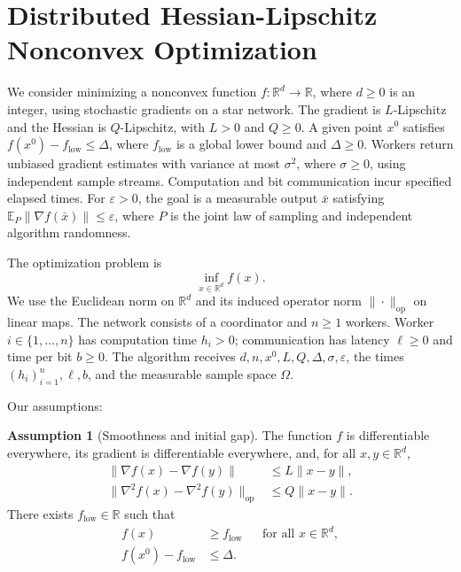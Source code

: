 \documentclass[10pt]{article}
\theoremstyle{definition}
\newtheorem{assumption}{Assumption}
\begin{document}
\section*{Distributed Hessian-Lipschitz Nonconvex Optimization}
We consider minimizing a nonconvex function $f:\mathbb{R}^d\to\mathbb{R}$, where $d\geq0$ is an integer, using stochastic gradients on a star network. The gradient is $L$-Lipschitz and the Hessian is $Q$-Lipschitz, with $L>0$ and $Q\geq0$. A given point $x^0$ satisfies $f(x^0)-f_{\mathrm{low}}\leq\Delta$, where $f_{\mathrm{low}}$ is a global lower bound and $\Delta\geq0$. Workers return unbiased gradient estimates with variance at most $\sigma^2$, where $\sigma\geq0$, using independent sample streams. Computation and bit communication incur specified elapsed times. For $\varepsilon>0$, the goal is a measurable output $\bar{x}$ satisfying $\mathbb{E}_{P}\|\nabla f(\bar{x})\|\leq\varepsilon$, where $P$ is the joint law of sampling and independent algorithm randomness.

The optimization problem is
\[
\inf_{x\in\mathbb{R}^d} f(x).
\]
We use the Euclidean norm on $\mathbb{R}^d$ and its induced operator norm $\|\cdot\|_{\mathrm{op}}$ on linear maps. The network consists of a coordinator and $n\geq1$ workers. Worker $i\in\{1,\ldots,n\}$ has computation time $h_i>0$; communication has latency $\ell\geq0$ and time per bit $b\geq0$. The algorithm receives $d,n,x^0,L,Q,\Delta,\sigma,\varepsilon$, the times $(h_i)_{i=1}^n,\ell,b$, and the measurable sample space $\Omega$.

Our assumptions:
\begin{assumption}[Smoothness and initial gap]
The function $f$ is differentiable everywhere, its gradient is differentiable everywhere, and, for all $x,y\in\mathbb{R}^d$,
\[
\begin{aligned}
\|\nabla f(x)-\nabla f(y)\|&\leq L\|x-y\|,\\
\|\nabla^2 f(x)-\nabla^2 f(y)\|_{\mathrm{op}}&\leq Q\|x-y\|.
\end{aligned}
\]
There exists $f_{\mathrm{low}}\in\mathbb{R}$ such that
\[
\begin{aligned}
f(x)&\geq f_{\mathrm{low}} &&\text{for all }x\in\mathbb{R}^d,\\
f(x^0)-f_{\mathrm{low}}&\leq\Delta.
\end{aligned}
\]
\end{assumption}
\end{document}
